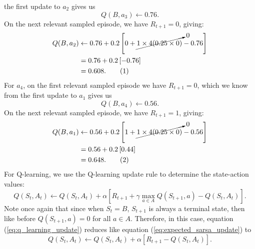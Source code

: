 \documentclass{article}
\newcommand\numberthis{\addtocounter{equation}{1}\tag{\theequation}}
\begin{document}
\begin{enumerate}
	      the first update to $a_2$ gives us
	      \begin{equation}
		      Q(B, a_3) \leftarrow 0.76.
	      \end{equation}
	      On the next relevant sampled episode, we have $R_{t+1} = 0$, giving:
	      \begin{align*}
		      Q(B, a_2) & \leftarrow 0.76 + 0.2 \left[ 0 + \cancelto{0}{1 \times 4(0.25 \times 0)}
		      - 0.76 \right]                                                                       \\
		                & = 0.76 + 0.2 \left[-0.76 \right]                                         \\
		                & = 0.608. \numberthis
	      \end{align*}
	      For $a_4$, on the first relevant sampled episode we have $R_{t+1} = 0$, which we know from
	      the first update to $a_1$ gives us
	      \begin{equation}
		      Q(B, a_4) \leftarrow 0.56.
	      \end{equation}
	      On the next relevant sampled episode, we have $R_{t+1} = 1$, giving:
	      \begin{align*}
		      Q(B, a_1) & \leftarrow 0.56 + 0.2 \left[1 + \cancelto{0}{1 \times 4(0.25 \times 0)} - 0.56
		      \right]                                                                                    \\
		                & = 0.56 + 0.2 \left[0.44 \right]                                                \\
		                & = 0.648.\numberthis
	      \end{align*}
	      For Q-learning, we use the Q-learning update rule to determine the state-action values:
	      \begin{equation}
		      Q(S_t, A_t) \leftarrow Q(S_t, A_t) + \alpha \left[ R_{t+1} + \gamma \max_{a \in A}
			      Q(S_{t+1}, a) - Q(S_t, A_t) \right].\label{eq:q_learning_update}
	      \end{equation}
	      Note once again that since when $S_t = B$, $S_{t+1}$ is always a terminal state, then like
	      before $Q(S_{t+1}, a) = 0$ for all $a \in A$. Therefore, in this case, equation
	      (\ref{eq:q_learning_update}) reduces like equation (\ref{eq:expected_sarsa_update}) to
	      \begin{equation}
		      Q(S_t, A_t) \leftarrow Q(S_t, A_t) + \alpha \left[ R_{t+1} - Q(S_t, A_t)
			      \right]. \label{eq:terminal_reduction}
	      \end{equation}

\end{enumerate}
\end{document}
